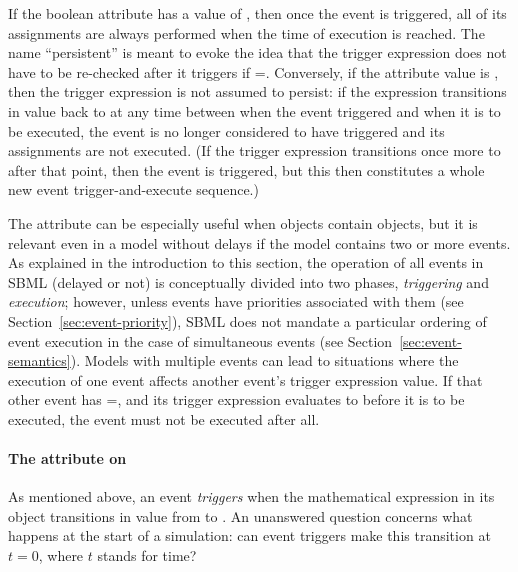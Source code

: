 If the boolean attribute  has a value of
, then once the event is triggered, all of its assignments
are always performed when the time of execution is reached.  The
name ``persistent'' is meant to evoke the idea that the trigger
expression does not have to be re-checked after it triggers if
=.  Conversely, if the attribute value
is , then the trigger expression is not assumed to
persist: if the expression transitions in value back to
 at any time between when the event triggered and when it
is to be executed, the event is no longer considered to have triggered
and its assignments are not executed.  (If the trigger expression
transitions once more to  after that point, then the
event is triggered, but this then constitutes a whole new event
trigger-and-execute sequence.)

The  attribute can be especially useful when
\Event objects contain \Delay objects, but it is relevant even in
a model without delays if the model contains two or more events.
As explained in the introduction to this section, the operation of
all events in SBML (delayed or not) is conceptually divided into
two phases, \emph{triggering} and \emph{execution}; however, unless
events have priorities associated with them (see
Section~\ref{sec:event-priority}), SBML does not mandate a
particular ordering of event execution in the case of simultaneous
events (see Section~\ref{sec:event-semantics}).  Models with
multiple events can lead to situations where the execution of one
event affects another event's trigger expression value.  If that
other event has =, and its trigger
expression evaluates to  before it is to be executed,
the event must not be executed after all.


\paragraph{The  attribute on \Trigger}
\label{sec:trigger-initialvalue}

As mentioned above, an event \emph{triggers} when the mathematical
expression in its \Trigger object transitions in value from
 to .  An unanswered question concerns what
happens at the start of a simulation: can event triggers make this
transition at $t = 0$, where $t$ stands for time?


